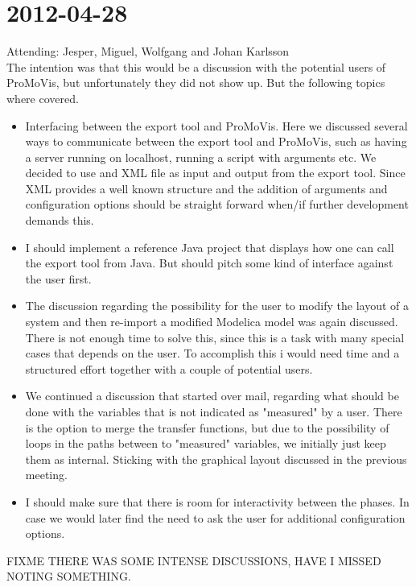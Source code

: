 \section{2012-04-28}
Attending: Jesper, Miguel, Wolfgang and Johan Karlsson\\\newline The intention was that this would be a discussion with the potential users of ProMoVis, but unfortunately they did not show up. But the following topics where covered.
\begin{itemize}
\item Interfacing between the export tool and ProMoVis. Here we discussed several ways to communicate between the export tool and ProMoVis, such as having a server running on localhost, running a script with arguments etc. We decided to use and XML file as input and output from the export tool. Since XML provides a well known structure and the addition of arguments and configuration options should be straight forward when/if further development demands this. 
\item I should implement a reference Java project that displays how one can call the export tool from Java. But should pitch some kind of interface against the user first.
\item The discussion regarding the possibility for the user to modify the layout of a system and then re-import a modified Modelica model was again discussed. There is not enough time to solve this, since this is a task with many special cases that depends on the user. To accomplish this i would need time and a structured effort together with a couple of potential users. 
\item We continued a discussion that started over mail, regarding what should be done with the variables that is not indicated as "measured" by a user. There is the option to merge the transfer functions, but due to the possibility of loops in the paths between to "measured" variables, we initially just keep them as internal. Sticking with the graphical layout discussed in the previous meeting.
\item I should make sure that there is room for interactivity between the phases. In case we would later find the need to ask the user for additional configuration options.
\end{itemize}
FIXME THERE WAS SOME INTENSE DISCUSSIONS, HAVE I MISSED NOTING SOMETHING.

